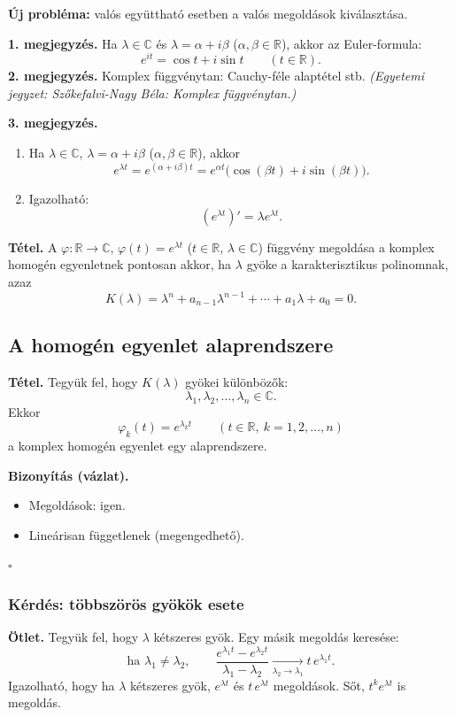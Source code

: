 \textbf{Új probléma:} valós együttható esetben a valós megoldások
kiválasztása.

\textbf{1. megjegyzés.} Ha $\lambda\in\mathbb C$ és
$\lambda=\alpha+i\beta$ ($\alpha,\beta\in\mathbb R$), akkor az
Euler-formula:
\[
 \boxed{e^{it}=\cos t+i\sin t\qquad(t\in\mathbb R).}
\]
\textbf{2. megjegyzés.} Komplex függvénytan: Cauchy-féle alaptétel stb.
\textit{(Egyetemi jegyzet: Szőkefalvi-Nagy Béla: Komplex függvénytan.)}

\textbf{3. megjegyzés.}
\begin{enumerate}[label=\roman*)]
\item Ha $\lambda\in\mathbb C$, $\lambda=\alpha+i\beta$
($\alpha,\beta\in\mathbb R$), akkor
\[
 e^{\lambda t}=e^{(\alpha+i\beta)t}
 =e^{\alpha t}\bigl(\cos(\beta t)+i\sin(\beta t)\bigr).
\]
\item Igazolható:
\[
 (e^{\lambda t})'=\lambda e^{\lambda t}.
\]
\end{enumerate}

\begin{matbox}
\textbf{Tétel.} A $\varphi:\mathbb R\longrightarrow\mathbb C$,
$\varphi(t)=e^{\lambda t}$ ($t\in\mathbb R$, $\lambda\in\mathbb C$)
függvény megoldása a komplex homogén egyenletnek pontosan akkor,
ha $\lambda$ gyöke a karakterisztikus polinomnak, azaz
\[
 K(\lambda)=\lambda^n+a_{n-1}\lambda^{n-1}
 +\cdots+a_1\lambda+a_0=0.
\]
\end{matbox}

\subsection{A homogén egyenlet alaprendszere}
\begin{matbox}
\textbf{Tétel.} Tegyük fel, hogy $K(\lambda)$ gyökei különbözők:
\[
 \lambda_1,\lambda_2,\ldots,\lambda_n\in\mathbb C.
\]
Ekkor
\[
 \varphi_k(t)=e^{\lambda_k t}
 \qquad(t\in\mathbb R,\ k=1,2,\ldots,n)
\]
a komplex homogén egyenlet egy alaprendszere.
\end{matbox}

\textbf{Bizonyítás (vázlat).}
\begin{itemize}
 \item Megoldások: igen.
 \item Lineárisan függetlenek (megengedhető).
\end{itemize}
\hfill$\square$

\subsubsection*{Kérdés: többszörös gyökök esete}
\textbf{Ötlet.} Tegyük fel, hogy $\lambda$ kétszeres gyök.
Egy másik megoldás keresése:
\[
 \text{ha }\lambda_1\ne\lambda_2,\qquad
 \frac{e^{\lambda_1 t}-e^{\lambda_2 t}}{\lambda_1-\lambda_2}
 \xrightarrow[\lambda_2\to\lambda_1]{} t\,e^{\lambda_1t}.
\]
Igazolható, hogy ha $\lambda$ kétszeres gyök,
$e^{\lambda t}$ és $t\,e^{\lambda t}$ megoldások.
Sőt, $t^k e^{\lambda t}$ is megoldás.

